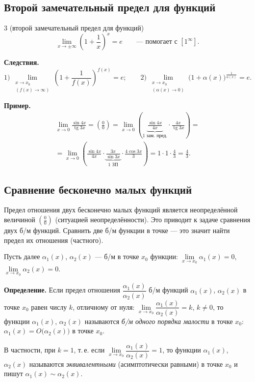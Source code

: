 \documentclass[a4paper,11pt]{article}
\newcommand{\prim}{\textbf{Пример.}\ }
\begin{document}
\subsection{Второй замечательный предел для функций}

\begin{teor}{3 (второй замечательный предел для функций)}
  \[
    \lim_{x \to \pm\infty} \left(1 + \frac{1}{x}\right)^x = e
    \qquad \text{--- помогает с } [1^\infty].
  \]
\end{teor}

\textbf{Следствия.}
\[
  1)\ \lim_{\substack{x \to x_0\\ (f(x) \to \infty)}} \left(1 + \frac{1}{f(x)}\right)^{f(x)} = e;
  \qquad
  2)\ \lim_{\substack{x \to x_0\\ (\alpha(x) \to 0)}} \big(1 + \alpha(x)\big)^{\frac{1}{\alpha(x)}} = e.
\]

\prim
\begin{multline*}
  \lim_{x \to 0} \frac{\sin 4x}{\operatorname{tg} 3x}
  = \left(\frac{0}{0}\right)
  = \lim_{x \to 0} \left(\underbrace{\frac{\sin 4x}{4x}}_{\text{1 зам. пред.}} \cdot \frac{4x}{\operatorname{tg} 3x}\right) = \\
  = \lim_{x \to 0} \left(\frac{\sin 4x}{4x} \cdot \underbrace{\frac{3x}{\sin 3x}}_{\text{1 ЗП}} \cdot \frac{4 \cos 3x}{3}\right)
  = 1 \cdot 1 \cdot \frac{4}{3} = \frac{4}{3}.
\end{multline*}

\subsection{Сравнение бесконечно малых функций}

Предел отношения двух бесконечно малых функций является неопределённой величиной
$\left(\frac{0}{0}\right)$ (ситуацией неопределённости). Это приводит к задаче
сравнения двух б/м функций. Сравнить две б/м функции в точке --- это значит найти
предел их отношения (частного).

Пусть далее $\alpha_1(x)$, $\alpha_2(x)$ --- б/м в точке $x_0$ функции:
$\lim\limits_{x \to x_0} \alpha_1(x) = 0$, $\lim\limits_{x \to x_0} \alpha_2(x) = 0$.

\begin{opr}
\textbf{Определение.}
  Если предел отношения $\dfrac{\alpha_1(x)}{\alpha_2(x)}$ б/м функций $\alpha_1(x)$,
  $\alpha_2(x)$ в точке $x_0$ равен числу $k$, отличному от нуля:
  $\lim\limits_{x \to x_0} \dfrac{\alpha_1(x)}{\alpha_2(x)} = k$, $k \ne 0$, то функции
  $\alpha_1(x)$, $\alpha_2(x)$ называются \emph{б/м одного порядка малости} в точке $x_0$:
  $\alpha_1(x) = O\big(\alpha_2(x)\big)$ в точке $x_0$.

  В частности, при $k = 1$, т.\,е. если
  $\lim\limits_{x \to x_0} \dfrac{\alpha_1(x)}{\alpha_2(x)} = 1$, то функции $\alpha_1(x)$,
  $\alpha_2(x)$ называются \emph{эквивалентными} (асимптотически равными) в точке $x_0$
  и пишут $\alpha_1(x) \sim \alpha_2(x)$.
\end{opr}
\end{document}
